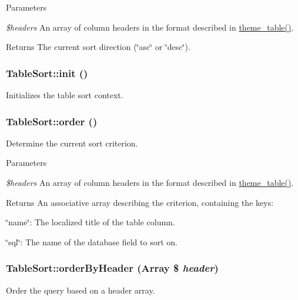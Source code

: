 \begin{DoxyParams}{Parameters}
\item[{\em \$headers}]An array of column headers in the format described in \hyperlink{group__themeable_ga9e35aa108c35f87b588197138a51823d}{theme\_\-table()}. \end{DoxyParams}
\begin{DoxyReturn}{Returns}
The current sort direction (\char`\"{}asc\char`\"{} or \char`\"{}desc\char`\"{}). 
\end{DoxyReturn}
\hypertarget{classTableSort_ab3165d4f0a0580c997db2dc8577d1a02}{
\subsubsection[{init}]{\setlength{\rightskip}{0pt plus 5cm}TableSort::init ()}}
\label{classTableSort_ab3165d4f0a0580c997db2dc8577d1a02}
Initializes the table sort context. \hypertarget{classTableSort_a098cd3fed81ee37ad2159309203ada60}{
\subsubsection[{order}]{\setlength{\rightskip}{0pt plus 5cm}TableSort::order ()}}
\label{classTableSort_a098cd3fed81ee37ad2159309203ada60}
Determine the current sort criterion.


\begin{DoxyParams}{Parameters}
\item[{\em \$headers}]An array of column headers in the format described in \hyperlink{group__themeable_ga9e35aa108c35f87b588197138a51823d}{theme\_\-table()}. \end{DoxyParams}
\begin{DoxyReturn}{Returns}
An associative array describing the criterion, containing the keys:
\begin{DoxyItemize}
\item \char`\"{}name\char`\"{}: The localized title of the table column.
\item \char`\"{}sql\char`\"{}: The name of the database field to sort on. 
\end{DoxyItemize}
\end{DoxyReturn}
\hypertarget{classTableSort_a47053e8a5d2ff21846e09ce00e4b21e4}{
\subsubsection[{orderByHeader}]{\setlength{\rightskip}{0pt plus 5cm}TableSort::orderByHeader (Array \$ {\em header})}}
\label{classTableSort_a47053e8a5d2ff21846e09ce00e4b21e4}
Order the query based on a header array.

